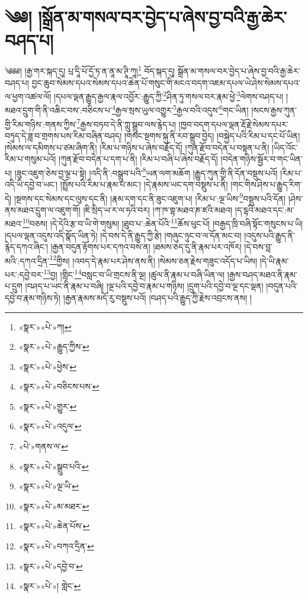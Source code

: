 \chapter{༄༅། །སྒྲོན་མ་གསལ་བར་བྱེད་པ་ཞེས་བྱ་བའི་རྒྱ་ཆེར་བཤད་པ།}༄༅༅། །རྒྱ་གར་སྐད་དུ། པྲ་དཱི་པོ་དྱོ་ཏ་ན་ནཱ་མ་ཊཱི་ཀཱ།\footnote{«སྣར་»«པེ་»ཀ།} བོད་སྐད་དུ། སྒྲོན་མ་གསལ་བར་བྱེད་པ་ཞེས་བྱ་བའི་རྒྱ་ཆེར་བཤད་པ། བྱང་ཆུབ་སེམས་དཔའ་སེམས་དཔའ་ཆེན་པོ་གསུང་གི་མངའ་བདག་འཇམ་དཔལ་ཡེ་ཤེས་སེམས་དཔའ་ལ་ཕྱག་འཚལ་ལོ། །དཔལ་ལྡན་རྒྱུད་རྒྱལ་རྣལ་འབྱོར་:རྒྱུད་ཀྱི་\footnote{«སྣར་»«པེ་»རྒྱུད་ཀྱིས་}ཤིན་ཏུ་གསལ་བར་རྣམ་ཕྱེ་\footnote{«སྣར་»«པེ་»ཕྱེས་}ལེགས་བཤད་པ། །མཐའ་དྲུག་གི་ནི་འཆིང་བས་:བཅིངས་པ་\footnote{«སྣར་»«པེ་»བཅིངས་པས་}རྒྱལ་སྲས་ཡུལ་འགྱུར་\footnote{«སྣར་»«པེ་»གྱུར་}རྒྱལ་བའི་འདུས་\footnote{«སྣར་»«པེ་»འདུལ་}གང་ཡིན། །སངས་རྒྱས་ཀུན་གྱི་རིམ་གཉིས་:གནས་ཀྱིས་\footnote{«པེ་»གནས་ལ་}རྒྱས་བཏབ་དེ་ནི་ཀླུ་སྒྲུབ་ལས་རྙེད་པ། །ཁྱབ་བདག་དཔལ་ལྡན་རྡོ་རྗེ་སེམས་དཔར་བཏུད་དེ་ཟླ་བ་གྲགས་པས་རིམ་བཞིན་བཤད། །གསང་སྔགས་སྐུ་ནི་རབ་སྒྲུབ་བྱེད། །བསྐྱེད་པའི་རིམ་པ་དང་པོ་ཡིན། །སེམས་ལ་དམིགས་པ་ཙམ་ཞིག་ནི། །རིམ་པ་གཉིས་པ་ཞེས་བརྗོད་དོ། །ཀུན་རྫོབ་བདེན་པ་བསྟན་པ་ནི། །ཡིད་འོང་རིམ་པ་གསུམ་པའོ། །ཀུན་རྫོབ་བདེན་པ་དག་པ་ནི། །རིམ་པ་བཞི་པ་ཞེས་བརྗོད་དོ། །བདེན་གཉིས་སྦྱོར་བ་གང་ཡིན་པ། །ཟུང་འཇུག་ཅེས་བྱ་ལྔ་པ་སྟེ། །འདི་ནི་:བསྒྲུབ་པའི་\footnote{«སྣར་»«པེ་»སྒྲུབ་པའི་}ཡན་ལག་མཆོག །རྒྱུད་ཀུན་གྱི་ནི་དོན་བསྡུས་པའོ། །རིམ་པ་འདི་ཡི་དབྱེ་བ་ཡང་། །སྤྲོས་པའི་རིམ་པ་རྣམ་པ་མང་། །དེ་རྣམས་ཡང་དག་བསྡུས་པ་ནི། །གང་གིས་ཤེས་པ་རྒྱུད་རིག་དེ། །སྔགས་དང་སེམས་དང་ལུས་དང་ནི། །རྣམ་དག་དང་ནི་ཟུང་འཇུག་པ། །རིམ་པ་:ལྔ་ཡིས་\footnote{«སྣར་»«པེ་»ལྔ་ཡི་}བསྡུས་པའི་དོན། །ཤེས་ནས་མཐའ་དྲུག་ལ་འཇུག་གོ། །ཇི་སྲིད་ཡ་ར་ལ་ཧའི་བར། །ཀ་ཁ་གྷ་མཐའ་ཎ་ཛའི་མཐའ། །ད་དྷའི་མཐའ་དང་:མ་མཐའ་\footnote{«སྣར་»«པེ་»མ་མཐར་}བཅས། །དེ་དེའི་རྩ་བ་ཡི་གེ་གསུམ། །ཐུབ་པ་:ཆེན་པོའི་\footnote{«སྣར་»«པེ་»ཆེན་པོས་}ཆོས་ཕུང་པོ། །བརྒྱད་ཁྲི་བཞི་སྟོང་གསུངས་པ་ཡི། །དཔལ་ལྡན་འདུས་འདི་སྣོད་ཡིན་ཏེ། །དེ་བས་དེ་ནི་རྒྱུད་ཀྱི་རྩེ། །གཞུང་ཉུང་བ་ལ་དོན་མང་བ། །འདུས་པའི་རྒྱུད་ནི་རྙེད་དཀའ་ཞིང་། །རྒྱན་བདུན་རྟོགས་པར་དཀའ་བས་ན། །ཐམས་ཅད་དུ་ནི་རྣམ་པར་འཁོར། །དེ་བས་བླ་མའི་:དཀའ་དྲིན་\footnote{«སྣར་»«པེ་»བཀའ་དྲིན་}གྱིས། །འབད་དེ་རྣམ་པར་ཤེས་ནས་ནི། །སེམས་ཅན་རྗེས་གཟུང་འདོད་པ་ཡིས། །དེ་ཡི་རྣམ་པར་:དབྱེ་བར་\footnote{«སྣར་»«པེ་»དབྱེ་བ་}བྱ། །གླིང་\footnote{«སྣར་»«པེ་»། གླེང་}བསླང་བ་ཡི་གྲངས་ནི་ལྔ། །ཚུལ་ནི་རྣམ་པ་བཞི་ཡིན་ལ། །རྒྱས་བཤད་མཐའ་ནི་རྣམ་པ་དྲུག །བཤད་པ་ཡང་ནི་རྣམ་པ་བཞི། །ལྔ་པའི་དབྱེ་བ་རྣམ་པ་གཉིས། །དྲུག་པའི་དབྱེ་བ་ལྔ་དང་ལྡན། །བདུན་པའི་དབྱེ་བ་རྣམ་གཉིས་ཏེ། །རྒྱན་རྣམས་མདོ་རུ་བསྡུས་པའོ། །བཤད་པའི་རྒྱུད་ཀྱི་རྗེས་འབྲངས་ནས། །
